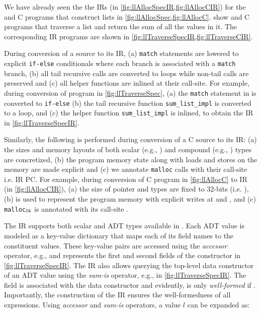 We have already seen the the IRs (in \cref{fig:llAllocSpecIR,fig:llAllocCIR}) for the \SpecL{} and C programs
that construct lists in \cref{fig:llAllocSpec,fig:llAllocC}.
 show \SpecL{} and C programs that traverse a list
and return the sum of all the values in it.
The corresponding IR programs are shown in \cref{fig:llTraverseSpecIR,fig:llTraverseCIR}.

During conversion of a \SpecL{} source to its IR,
(a) {\tt match} statements are lowered to explicit {\tt if-else} conditionals where each branch
is associated with a {\tt match} branch,
(b) all tail recursive calls are converted to loops while non-tail calls are preserved and
(c) all helper functions are inlined at their call-site.
For example, during conversion of \SpecL{} program in \cref{fig:llTraverseSpec},
(a) the {\tt match} statement in  is converted to {\tt if-else}
(b) the tail recursive function {\tt sum\_list\_impl} is converted to a loop,
and (c) the helper function {\tt sum\_list\_impl} is inlined,
to obtain the IR in \cref{fig:llTraverseSpecIR}.

Similarly, the following is performed during conversion of a C source to its IR:
(a) the sizes and memory layouts of both scalar (e.g., )
and compound (e.g., ) types are concretized,
(b) the program memory state along with loads and stores on the memory are made explicit and
(c) we annotate {\tt malloc} calls with their call-site i.e. IR PC.
For example, during conversion of C program in \cref{fig:llAllocC} to IR (in \cref{fig:llAllocCIR}),
(a) the size of pointer and  types are fixed to 32-bits (i.e. ),
(b) \mem{} is used to represent the program memory with explicit writes at  and ,
and (c) {\tt malloc$_{{\tt C4}}$} is annotated with its call-site .

The IR supports both scalar and ADT types available in \SpecL{}.
Each ADT value is modeled as a key-value dictionary that maps
each of its field names to the constituent values.
These key-value pairs are accessed using the {\em accessor} operator,
e.g.,  and  represents the first and second
fields of the  constructor in \cref{fig:llTraverseSpecIR}.
The IR also allows querying the top-level data constructor of an ADT value
using the {\em sum-is} operator, e.g.,  in \cref{fig:llTraverseSpecIR}.
The  field is associated with the  data constructor
and evidently,  is only {\em well-formed} if .
Importantly, the construction of the \SpecL{} IR ensures the well-formedness of all expressions.
Using {\em accessor} and {\em sum-is} operators, a  value $l$ can be expanded as:

